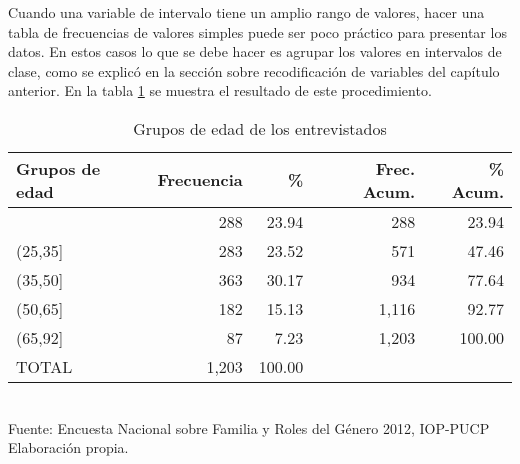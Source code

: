 \documentclass{article}
\begin{document}
Cuando una variable de intervalo tiene un amplio rango de valores, hacer una tabla de frecuencias de valores simples puede ser poco práctico para presentar los datos. En estos casos lo que se debe hacer es agrupar los valores en intervalos de clase, como se explicó en la sección sobre recodificación de variables del capítulo anterior. En la tabla \ref{tab:gedad} se muestra el resultado de este procedimiento.

\begin{table}[ht]
\begin{center}
\caption{Grupos de edad de los entrevistados}
\label{tab:gedad}
\begin{tabular}{lrrrr}
  \hline
Grupos de edad & Frecuencia & \% & Frec. Acum. & \% Acum. \\ 
\hline
[18,25] & 288 & 23.94 & 288 & 23.94 \\ 
  (25,35] & 283 & 23.52 & 571 & 47.46 \\ 
  (35,50] & 363 & 30.17 & 934 & 77.64 \\ 
  (50,65] & 182 & 15.13 & 1,116 & 92.77 \\ 
  (65,92] &  87 & 7.23 & 1,203 & 100.00 \\ 
   \hline
TOTAL & 1,203 & 100.00 & & \\
\hline
\end{tabular}
\\Fuente: Encuesta Nacional sobre Familia y Roles del Género 2012, IOP-PUCP
\\Elaboración propia.
\end{center}
\end{table}
\end{document}
